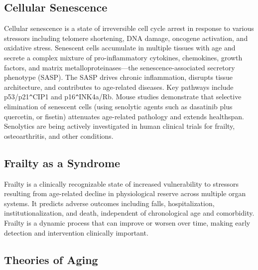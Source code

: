 \subsection{Cellular Senescence}
\label{sec:Cellular Senescence}

Cellular senescence is a state of irreversible cell cycle arrest in response to various stressors including telomere shortening, DNA damage, oncogene activation, and oxidative stress. Senescent cells accumulate in multiple tissues with age and secrete a complex mixture of pro-inflammatory cytokines, chemokines, growth factors, and matrix metalloproteinases---the senescence-associated secretory phenotype (SASP). The SASP drives chronic inflammation, disrupts tissue architecture, and contributes to age-related diseases. Key pathways include p53/p21\verb|^|CIP1 and p16\verb|^|INK4a/Rb. Mouse studies demonstrate that selective elimination of senescent cells (using senolytic agents such as dasatinib plus quercetin, or fisetin) attenuates age-related pathology and extends healthspan. Senolytics are being actively investigated in human clinical trials for frailty, osteoarthritis, and other conditions.

\subsection{Frailty as a Syndrome}
\label{sec:Frailty as a Syndrome}

Frailty is a clinically recognizable state of increased vulnerability to stressors resulting from age-related decline in physiological reserve across multiple organ systems. It predicts adverse outcomes including falls, hospitalization, institutionalization, and death, independent of chronological age and comorbidity. Frailty is a dynamic process that can improve or worsen over time, making early detection and intervention clinically important.

\subsection{Theories of Aging}
\label{sec:Theories of Aging}

